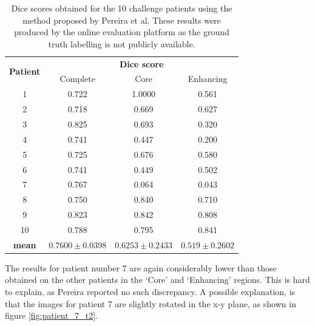 \documentclass[12pt,a4paper,twoside,openright]{report}
\begin{document}
\begin{table}
\centering	
\label{table:my_model_dice_results}
\begin{tabular}{ c | c c c} 
\multirow{2}{*}{\textbf{Patient}} & \multicolumn{3}{c}{\textbf{Dice score}} \\
 & Complete & Core & Enhancing \\
 \hline
1 &	0.722 & 1.0000 & 0.561\\
2 & 0.718 & 0.669 & 0.627 \\
3 & 0.825 & 0.693 & 0.320 \\
4 & 0.741 & 0.447 & 0.200 \\
5 & 0.725 & 0.676 & 0.580 \\
6 & 0.741 & 0.449 & 0.502 \\
7 & 0.767 & 0.064 & 0.043 \\
8 & 0.750 & 0.840 & 0.710 \\
9 & 0.823 & 0.842 & 0.808 \\
10 & 0.788 & 0.795 & 0.841 \\
\hline
\rule{0pt}{3ex}    
\textbf{mean} & $0.7600 \pm 0.0398$ & 	$0.6253 \pm 0.2433$ & $0.519  \pm 0.2602$ \\
\end{tabular}
\caption{Dice scores obtained for the 10 challenge patients using the method proposed by Pereira et al. These results were produced by the online evaluation platform as the ground truth labelling is not publicly available.}
\end{table}

The results for patient number 7 are again considerably lower than those obtained on the other patients in the `Core' and `Enhancing' regions. This is hard to explain, as Pereira reported no such discrepancy. A possible explanation, is that the images for patient 7 are slightly rotated in the x-y plane, as shown in figure \ref{fig:patient_7_t2}.
\end{document}
